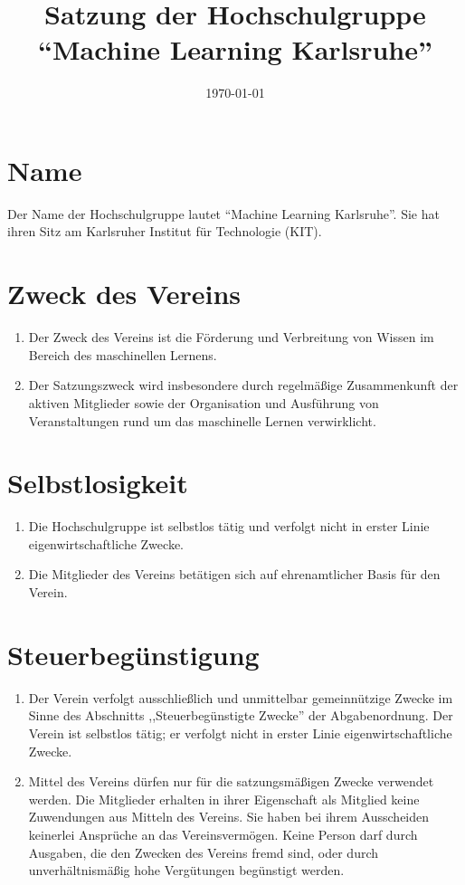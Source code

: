\documentclass[a4paper]{scrartcl}
\newcommand\GruppenName{Machine Learning Karlsruhe}
\begin{document}
 \author{}
\title{Satzung der Hochschulgruppe \\ \enquote{\GruppenName{}}}
\date{\today}
\maketitle


\section{Name}
Der Name der Hochschulgruppe lautet \enquote{\GruppenName{}}. Sie hat ihren
Sitz am Karlsruher Institut für Technologie (KIT).

\section{Zweck des Vereins}
\begin{enumerate}
    \item Der Zweck des Vereins ist die Förderung und Verbreitung von Wissen
          im Bereich des maschinellen Lernens.
    \item Der Satzungszweck wird insbesondere durch regelmäßige
          Zusammenkunft der aktiven Mitglieder sowie der Organisation und
          Ausführung von Veranstaltungen rund um das maschinelle Lernen
          verwirklicht.
\end{enumerate}

\section{Selbstlosigkeit}
\begin{enumerate}
    \item Die Hochschulgruppe ist selbstlos tätig und verfolgt nicht in erster
          Linie eigenwirtschaftliche Zwecke.
    \item Die Mitglieder des Vereins betätigen sich auf ehrenamtlicher Basis
          für den Verein.
\end{enumerate}

\section{Steuerbegünstigung}
\begin{enumerate}
    \item Der Verein verfolgt ausschließlich und unmittelbar gemeinnützige
	  Zwecke im Sinne des Abschnitts ,,Steuerbegünstigte Zwecke''
	  der Abgabenordnung. Der Verein ist selbstlos tätig;
	  er verfolgt nicht in erster Linie eigenwirtschaftliche Zwecke.
    \item Mittel des Vereins dürfen nur für die satzungsmäßigen Zwecke
	  verwendet werden. Die Mitglieder erhalten in ihrer Eigenschaft
	  als Mitglied keine Zuwendungen aus Mitteln des Vereins.
	  Sie haben bei ihrem Ausscheiden keinerlei Ansprüche an das
	  Vereinsvermögen. Keine Person darf durch Ausgaben, die den
	  Zwecken des Vereins fremd sind, oder durch unverhältnismäßig
	  hohe Vergütungen begünstigt werden.
\end{enumerate}
\end{document}
